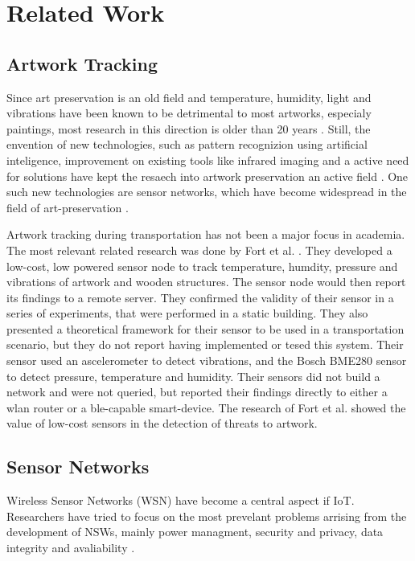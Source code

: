 \section{Related Work} %


\subsection{Artwork Tracking}


Since art preservation is an old field and temperature, humidity, light and vibrations have been known to be detrimental to most artworks, especialy paintings, most research in this direction is older than 20 years \cite{mecklenburg1991mechanical, michalski1991paintings, saunders2004effect}.
Still, the envention of new technologies, such as pattern recognizion using artificial inteligence, improvement on existing tools like infrared imaging and a active need for solutions have kept the resaech into artwork preservation an active field \cite{borg2020application, schito2017integrated}.
One such new technologies are sensor networks, which have become widespread in the field of art-preservation \cite{shah2016customized}.


Artwork tracking during transportation has not been a major focus in academia.
The most relevant related research was done by Fort et al. \cite{landi2022iot}.
They developed a low-cost, low powered sensor node to track temperature, humdity, pressure and vibrations of artwork and wooden structures.
The sensor node would then report its findings to a remote server.
They confirmed the validity of their sensor in a series of experiments, that were performed in a static building.
They also presented a theoretical framework for their sensor to be used in a transportation scenario, but they do not report having implemented or tesed this system.
Their sensor used an ascelerometer to detect vibrations, and the Bosch BME280 sensor to detect pressure, temperature and humidity.
Their sensors did not build a network and were not queried, but reported their findings directly to either a wlan router or a ble-capable smart-device.
The research of Fort et al. showed the value of low-cost sensors in the detection of threats to artwork.

\subsection{Sensor Networks}

Wireless Sensor Networks (WSN) have become a central aspect if IoT.
Researchers have tried to focus on the most prevelant problems arrising from the development of NSWs, mainly power managment, security and privacy, data integrity and avaliability \cite{gulati2022review}.


